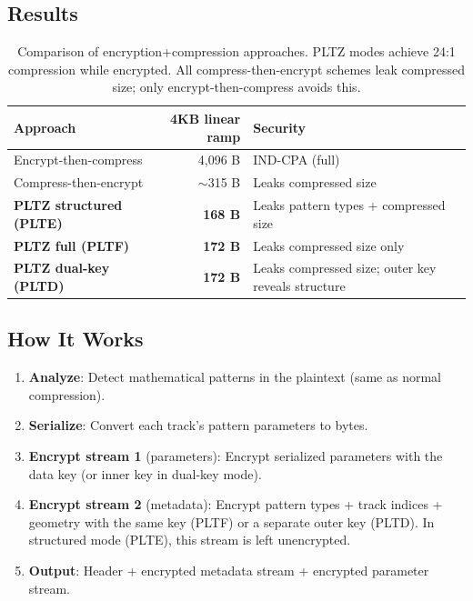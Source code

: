 \documentclass[11pt,a4paper]{article}
\begin{document}
\subsection{Results}

\begin{table}[H]
\centering
\begin{tabular}{@{}lrl@{}}
\toprule
\textbf{Approach} & \textbf{4KB linear ramp} & \textbf{Security} \\
\midrule
Encrypt-then-compress & 4,096 B & IND-CPA (full) \\
Compress-then-encrypt & $\sim$315 B & Leaks compressed size \\
\textbf{PLTZ structured (PLTE)} & \textbf{168 B} & Leaks pattern types + compressed size \\
\textbf{PLTZ full (PLTF)} & \textbf{172 B} & Leaks compressed size only \\
\textbf{PLTZ dual-key (PLTD)} & \textbf{172 B} & Leaks compressed size; outer key reveals structure \\
\bottomrule
\end{tabular}
\caption{Comparison of encryption+compression approaches. PLTZ modes achieve 24:1 compression while encrypted. All compress-then-encrypt schemes leak compressed size; only encrypt-then-compress avoids this.}
\end{table}

\subsection{How It Works}

\begin{enumerate}
\item \textbf{Analyze}: Detect mathematical patterns in the plaintext (same as normal compression).
\item \textbf{Serialize}: Convert each track's pattern parameters to bytes.
\item \textbf{Encrypt stream 1} (parameters): Encrypt serialized parameters with the data key (or inner key in dual-key mode).
\item \textbf{Encrypt stream 2} (metadata): Encrypt pattern types + track indices + geometry with the same key (PLTF) or a separate outer key (PLTD). In structured mode (PLTE), this stream is left unencrypted.
\item \textbf{Output}: Header + encrypted metadata stream + encrypted parameter stream.
\end{enumerate}
\end{document}
